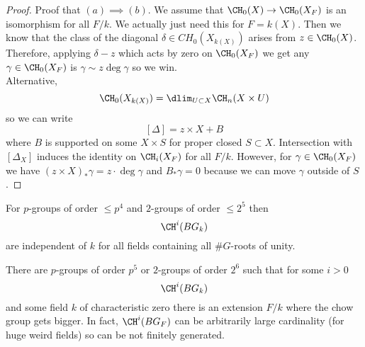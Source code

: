 \documentclass{article}
\begin{document}
\begin{proof}
Proof that $(a) \implies (b)$. We assume that $\CH_0(X) \to \CH_0(X_F)$ is an isomorphism for all $F / k$. We actually just need this for $F = k(X)$. Then we know that the class of the diagonal $\delta \in CH_0(X_{k(X)})$ arises from $z \in \CH_0(X)$. Therefore, applying $\delta - z$ which acts by zero on $\CH_0(X_F)$ we get any $\gamma \in \CH_0(X_F)$ is $\gamma \sim z \deg{\gamma}$ so we win. 
\bigskip\\
Alternative,
\[ \CH_0(X_{k(X)}) = \dlim_{U \subset X} \CH_n(X \times U) \]
so we can write
\[ [\Delta] = z \times X + B \]
where $B$ is supported on some $X \times S$ for proper closed $S \subset X$. Intersection with $[\Delta_X]$ induces the identity on $\CH_i(X_F)$ for all $F / k$. However, for $\gamma \in \CH_0(X_F)$ we have $(z \times X)_* \gamma = z \cdot \deg{\gamma}$ and $B_* \gamma = 0$ because we can move $\gamma$ outside of $S$.  
\end{proof}

For $p$-groups of order $\le p^4$ and $2$-groups of order $\le 2^5$ then 
\[ \CH^i(BG_k) \]
are independent of $k$ for all fields containing all $\# G$-roots of unity. 

\begin{theorem}[T]
There are $p$-groups of order $p^5$ or $2$-groups of order $2^6$ such that for some $i > 0$
\[ \CH^i(BG_k) \]
and some field $k$ of characteristic zero there is an extension $F / k$ where the chow group gets bigger. In fact, $\CH^i(BG_F)$ can be arbitrarily large cardinality (for huge weird fields) so can be not finitely generated. 
\end{theorem}
\end{document}
